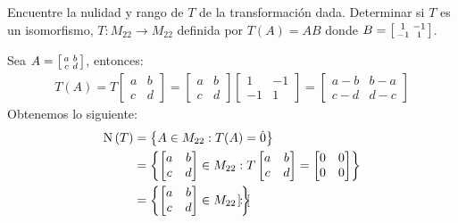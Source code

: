 \begin{exercise}
	Encuentre la nulidad y rango de $T$ de la transformación dada. Determinar si $T$ es un isomorfismo, $T:M_{22}\to M_{22}$ definida por $T(A) = AB$ donde $B =\left[ \begin{smallmatrix}
		1 & -1\\
		-1 & 1
	\end{smallmatrix} \right]$.
\end{exercise}
\begin{solution}
	Sea $A =\begin{bsmallmatrix}
		a & b\\
		c & d
	\end{bsmallmatrix}$, entonces:
	\begin{align*}
		T(A) = T
		\begin{bmatrix}
			a & b\\
			c & d
		\end{bmatrix}
		=
		\begin{bmatrix}
			a & b\\
			c & d
		\end{bmatrix}
		\begin{bmatrix}
			1 & -1\\
			-1 & 1
		\end{bmatrix}
		=
		\begin{bmatrix}
			a - b & b - a\\
			c - d & d - c
		\end{bmatrix}
	\end{align*}
	Obtenemos lo siguiente:
	\begin{align*}
		\mnuc{T} &=\set{A\in M_{22}: T(A) =\hat{0}}\\
		&=\set{
			\begin{bmatrix}
				a & b\\
				c & d
			\end{bmatrix}
			\in M_{22}:
			T
			\begin{bmatrix}
				a & b\\
				c & d
			\end{bmatrix}
			=
			\begin{bmatrix}
				0 & 0\\
				0 & 0
			\end{bmatrix}
		}\\
		& =\set{
			\begin{bmatrix}
				a & b\\
				c & d
			\end{bmatrix}
			\in M_{22}:
			\begin{bmatrix}

\end{bmatrix}}
\end{align*}
\end{solution}
